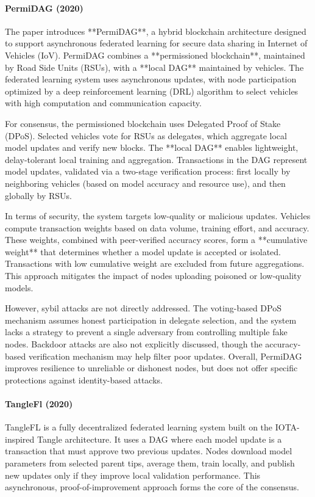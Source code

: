 \newpage
\paragraph{PermiDAG (2020)} \cite{lu_blockchain_2020}
The paper introduces **PermiDAG**, a hybrid blockchain architecture designed to support asynchronous federated learning for secure data sharing in Internet of Vehicles (IoV). PermiDAG combines a **permissioned blockchain**, maintained by Road Side Units (RSUs), with a **local DAG** maintained by vehicles. The federated learning system uses asynchronous updates, with node participation optimized by a deep reinforcement learning (DRL) algorithm to select vehicles with high computation and communication capacity.

For consensus, the permissioned blockchain uses Delegated Proof of Stake (DPoS). Selected vehicles vote for RSUs as delegates, which aggregate local model updates and verify new blocks. The **local DAG** enables lightweight, delay-tolerant local training and aggregation. Transactions in the DAG represent model updates, validated via a two-stage verification process: first locally by neighboring vehicles (based on model accuracy and resource use), and then globally by RSUs.

In terms of security, the system targets low-quality or malicious updates. Vehicles compute transaction weights based on data volume, training effort, and accuracy. These weights, combined with peer-verified accuracy scores, form a **cumulative weight** that determines whether a model update is accepted or isolated. Transactions with low cumulative weight are excluded from future aggregations. This approach mitigates the impact of nodes uploading poisoned or low-quality models.

However, sybil attacks are not directly addressed. The voting-based DPoS mechanism assumes honest participation in delegate selection, and the system lacks a strategy to prevent a single adversary from controlling multiple fake nodes. Backdoor attacks are also not explicitly discussed, though the accuracy-based verification mechanism may help filter poor updates. Overall, PermiDAG improves resilience to unreliable or dishonest nodes, but does not offer specific protections against identity-based attacks.

\newpage
\paragraph{TangleFl (2020)} \cite{schmid_tangle_2020}
TangleFL is a fully decentralized federated learning system built on the IOTA-inspired Tangle architecture. It uses a DAG where each model update is a transaction that must approve two previous updates. Nodes download model parameters from selected parent tips, average them, train locally, and publish new updates only if they improve local validation performance. This asynchronous, proof-of-improvement approach forms the core of the consensus.

